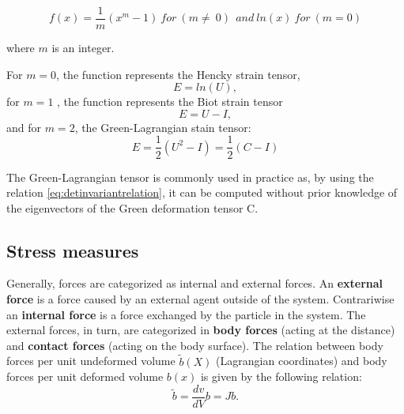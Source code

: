 \begin{equation}
f(x) = \frac{1}{m}(x^m-1) \ for \ (m \ne\ 0)\  \ and \ ln(x) \ for \ (m=0)
\end{equation}

where $m$ is an integer.

For $m = 0$, the function represents the Hencky strain tensor, 
\begin{equation}
E = ln(U), 
\end{equation}
for $m=1$ , the function represents the Biot strain tensor 
\begin{equation}
E = U-I,
\end{equation}
and for $m=2$, the Green-Lagrangian stain tensor:
\begin{equation}
E = \frac{1}{2}(U^2-I) =  \frac{1}{2}(C-I)
\end{equation}

The Green-Lagrangian tensor is commonly used in practice as, by using the relation \ref{eq:detinvariantrelation}, it can be computed without prior knowledge of the eigenvectors of the Green deformation tensor C.
%

\subsection{Stress measures}\label{subsection:stressmeasure}

Generally, forces are categorized as internal and external forces. An \textbf{external force } is a force caused by an external agent outside of the system. Contrariwise an \textbf{internal force} is a force exchanged by the particle in the system. The external forces, in turn, are categorized in \textbf{body forces} (acting at the distance) and \textbf{contact forces} (acting on the body surface). The relation between body forces per unit undeformed volume $\tilde{b}(X)$ (Lagrangian coordinates) and body forces per unit deformed volume $b(x)$ is given by the following relation:
\begin{equation}
\tilde{b} = \frac{dv}{dV} b = Jb.
\end{equation}

